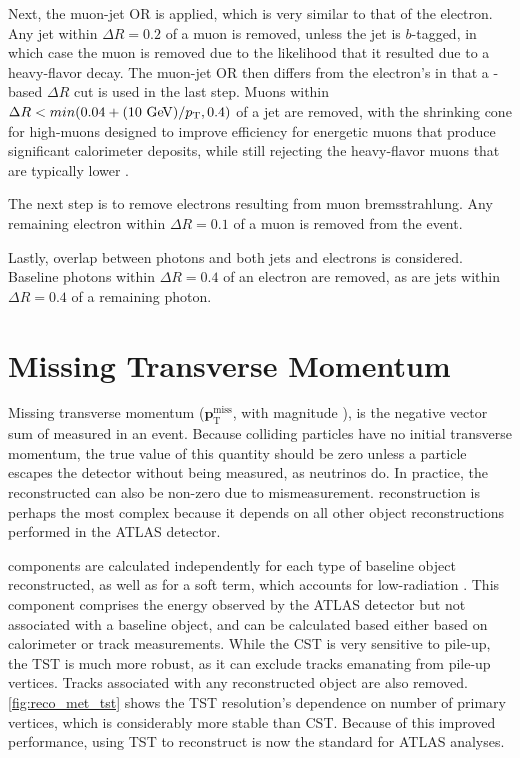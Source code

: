 Next, the muon-jet \ac{OR} is applied, which is very similar to that of the electron. Any jet within $\Delta R = 0.2$ of a muon is removed, unless the jet is $b$-tagged, in which case the muon is removed due to the likelihood that it resulted due to a heavy-flavor decay. The muon-jet \ac{OR} then differs from the electron's in that a \pt-based $\Delta R$ cut is used in the last step. Muons within $\Delta R < min(0.04 + (10 \gev)/\pt, 0.4)$ of a jet are removed, with the shrinking cone for high-\pt muons designed to improve efficiency for energetic muons that produce significant calorimeter deposits, while still rejecting the heavy-flavor muons that are typically lower \pt. 

The next step is to remove electrons resulting from muon bremsstrahlung. Any remaining electron within $\Delta R = 0.1$ of a muon is removed from the event. 

Lastly, overlap between photons and both jets and electrons is considered. Baseline photons within $\Delta R = 0.4$ of an electron are removed, as are jets within $\Delta R = 0.4$ of a remaining photon.

\section{Missing Transverse Momentum}
\label{sec:reco_met}

Missing transverse momentum (${\boldsymbol p}_{\mathrm{T}}^\mathrm{miss}$, with magnitude \met), is the negative vector sum of \pt measured in an event. Because colliding particles have no initial transverse momentum, the true value of this quantity should be zero unless a particle escapes the detector without being measured, as neutrinos do. In practice, the reconstructed \met can also be non-zero due to mismeasurement. \met reconstruction is perhaps the most complex because it depends on all other object reconstructions performed in the \ac{ATLAS} detector. 

\met components are calculated independently for each type of baseline object reconstructed, as well as for a soft term, which accounts for low-\pt radiation \cite{ATL-PHYS-PUB-2015-023}. This component comprises the energy observed by the \ac{ATLAS} detector but not associated with a baseline object, and can be calculated based either based on calorimeter or track measurements. While the \acf{CST} is very sensitive to pile-up, the \acf{TST} is much more robust, as it can exclude tracks emanating from pile-up vertices. Tracks associated with any reconstructed object are also removed. \autoref{fig:reco_met_tst} shows the \ac{TST} resolution's dependence on number of primary vertices, which is considerably more stable than \ac{CST}. Because of this improved performance, using \ac{TST} to reconstruct \met is now the standard for \ac{ATLAS} analyses.

